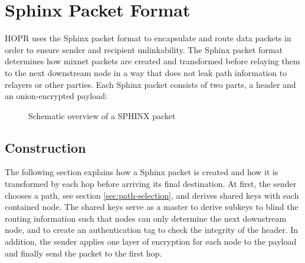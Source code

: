 \section{Sphinx Packet Format}
\label{sec:sphinx}

HOPR uses the Sphinx packet format \cite{sphinxpaper} to encapsulate and route data packets in order to ensure sender and recipient unlinkability. The Sphinx packet format determines how mixnet packets are created and transformed before relaying them to the next downstream node in a way that does not leak path information to relayers or other parties. Each Sphinx packet consists of two parts, a header and an onion-encrypted payload:

\begin{figure}[H]
    \centering
    \label{fig:sphinxoverview}
    \caption{Schematic overview of a SPHINX packet}
\end{figure}

\subsection{Construction}

The following section explains how a Sphinx packet is created and how it is transformed by each hop before arriving its final destination. At first, the sender chooses a path, see section \ref{sec:path-selection}, and derives shared keys with each contained node. The shared keys serve as a master to derive subkeys to blind the routing information such that nodes can only determine the next downstream node, and to create an authentication tag to check the integrity of the header. In addition, the sender applies one layer of encryption for each node to the payload and finally send the packet to the first hop.

